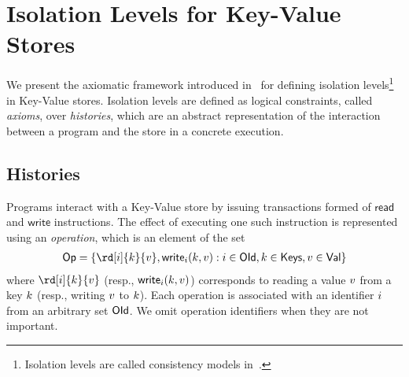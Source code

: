 \section{Isolation Levels for Key-Value Stores}
\label{sec:ax-kv}

%
%
%

We present the axiomatic framework introduced in~\cite{DBLP:journals/pacmpl/BiswasE19} for defining isolation levels\footnote{Isolation levels are called consistency models in~\cite{DBLP:journals/pacmpl/BiswasE19}.} in Key-Value stores. Isolation levels are defined as logical constraints, called \emph{axioms}, over \emph{histories}, which are an abstract representation of the interaction between a program and the store in a concrete execution. 


\subsection{Histories}

Programs interact with a Key-Value store by issuing transactions formed of $\textsf{read}$ and $\textsf{write}$ instructions. The effect of executing one such instruction is represented using an \emph{operation}, which is an element of the set
\begin{align*}
 \Op=\set{\rd[\id]{\key}{\val},\wrt[\id]{\key}{\val}: \id\in\OId, \key\in\Keys, \val\in \Val}
\end{align*} 
where $\rd[\id]{\key}{\val}$ (resp., $\wrt[\id]{\key}{\val}$) corresponds to reading a value $\val$ from a key $\key$ (resp., writing $\val$ to $\key$). Each operation is associated with an identifier $\id$ from an arbitrary set $\OId$. We omit operation identifiers when they are not important.

